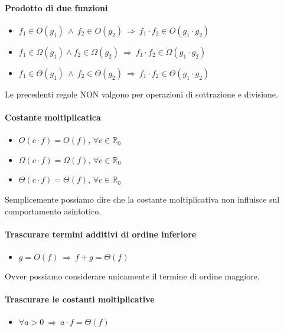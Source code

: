 \documentclass{article}
\begin{document}
\paragraph{Prodotto di due funzioni}

\begin{itemize}
    \item $f_1 \in O(g_1) \ \wedge \ f_2 \in O(g_2) \ \Rightarrow \ f_1 \cdot f_2 \in O(g_1 \cdot g_2 )$
    \item $f_1 \in \Omega(g_1) \wedge f_2 \in \Omega(g_2) \ \Rightarrow \ f_1 \cdot f_2 \in \Omega(g_1 \cdot g_2)$
    \item $f_1 \in \Theta(g_1) \ \wedge \ f_2 \in \Theta(g_2) \ \Rightarrow \ f_1 \cdot f_2 \in \Theta(g_1 \cdot g_2)$
\end{itemize}

Le precedenti regole NON valgono per operazioni di sottrazione e divisione.

\paragraph{Costante moltiplicatica}
\begin{itemize}
    \item $O(c \cdot f) = O(f)$, $\forall c \in \mathbb{R}_0$
    \item $\Omega(c \cdot f) = \Omega(f)$, $\forall c \in \mathbb{R}_0$
    \item $\Theta(c \cdot f) = \Theta(f)$, $\forall c \in \mathbb{R}_0$
\end{itemize}
Semplicemente possiamo dire che la costante moltiplicativa non influisce sul comportamento asintotico.

\paragraph{Trascurare termini additivi di ordine inferiore}
\begin{itemize}
    \item $g = O(f) \ \Rightarrow \ f + g = \Theta(f)$
\end{itemize}
Ovver possiamo considerare unicamente il termine di ordine maggiore.

\paragraph{Trascurare le costanti moltiplicative} 
\begin{itemize}
    \item $\forall a > 0 \ \Rightarrow \ a \cdot f = \Theta(f)$
\end{itemize}
\newpage
\end{document}
